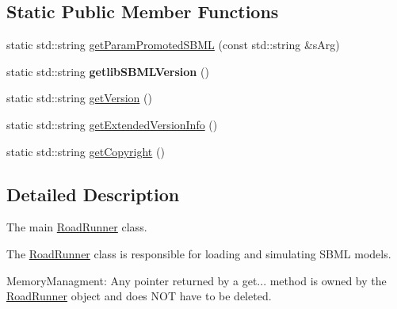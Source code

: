 \subsection*{Static Public Member Functions}
\begin{DoxyCompactItemize}
\item 
static std\-::string \hyperlink{classrr_1_1_road_runner_ab04e0b440a74f7d49f55751b346f4212}{get\-Param\-Promoted\-S\-B\-M\-L} (const std\-::string \&s\-Arg)
\item 
\hypertarget{classrr_1_1_road_runner_aa054cc8411c416aff41d61c8639ee6bd}{static std\-::string {\bfseries getlib\-S\-B\-M\-L\-Version} ()}\label{classrr_1_1_road_runner_aa054cc8411c416aff41d61c8639ee6bd}

\item 
static std\-::string \hyperlink{classrr_1_1_road_runner_a248d078936a41d47c8de44ac829389f4}{get\-Version} ()
\item 
static std\-::string \hyperlink{classrr_1_1_road_runner_afdb1fa322ff0f3d53e33e30558bbe478}{get\-Extended\-Version\-Info} ()
\item 
static std\-::string \hyperlink{classrr_1_1_road_runner_a4b773957d863f152b5744904e5229ca6}{get\-Copyright} ()
\end{DoxyCompactItemize}


\subsection{Detailed Description}
The main \hyperlink{classrr_1_1_road_runner}{Road\-Runner} class.

The \hyperlink{classrr_1_1_road_runner}{Road\-Runner} class is responsible for loading and simulating S\-B\-M\-L models.

Memory\-Managment\-: Any pointer returned by a get... method is owned by the \hyperlink{classrr_1_1_road_runner}{Road\-Runner} object and does N\-O\-T have to be deleted. 

